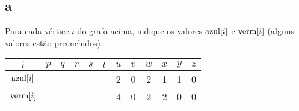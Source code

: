 \begin{figure}[H]
    \centering
    
    \caption{}
\end{figure}

\subsection{a} Para cada vértice $i$ do grafo acima, indique os valores $\mathrm{azul}[i]$ e $\mathrm{verm}[i]$ (alguns valores estão preenchidos).

\itemdsep[0.25]

\begin{table}[H]
    \centering
    \begin{tabular}{|c|c|c|c|c|c|c|c|c|c|c|c|}
        \hline
        $i$ & $p$ & $q$ & $r$ & $s$ & $t$ & $u$ & $v$ & $w$ & $x$ & $y$ & $z$ \\
        \hline
        $\mathrm{azul}[i]$ & & & & & & 2 & 0 & 2 & 1 & 1 & 0 \\
        \hline
        $\mathrm{verm}[i]$ & & & & & & 4 & 0 & 2 & 2 & 0 & 0 \\
        \hline
    \end{tabular}
\end{table}
